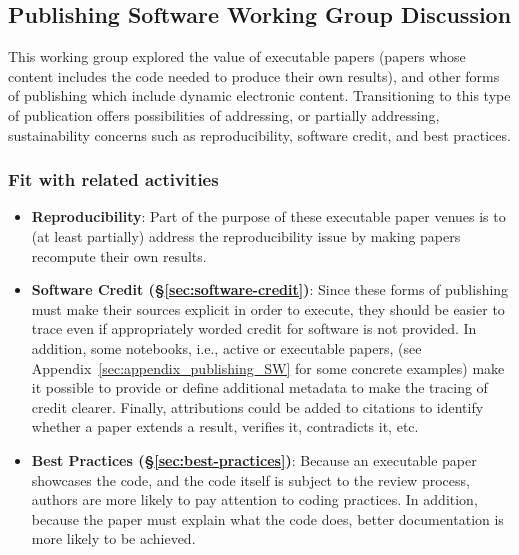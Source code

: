 \subsection{Publishing Software Working Group Discussion} \label{sec:publishing-software}

This working group explored the value of executable papers (papers whose content
includes the code needed to produce their own results), and other forms of
publishing which include dynamic electronic content.
%
%
Transitioning to this type of publication offers possibilities of addressing, or
partially addressing, sustainability concerns such as reproducibility, software
credit, and best practices.

\subsubsection{Fit with related activities}

\begin{itemize}
\item \textbf{Reproducibility}: Part of the purpose of these executable paper venues
is to (at least partially) address the reproducibility issue by making papers
recompute their own results.

\item\textbf{Software Credit (\S\ref{sec:software-credit})}: Since these forms of
publishing must make their sources explicit in order to execute, they should be
easier to trace even if appropriately worded credit for software is not
provided. In addition, some  notebooks, i.e., active or executable papers,
(see Appendix~\ref{sec:appendix_publishing_SW} for some concrete examples) 
make it possible to provide or define
additional metadata to make the tracing of credit clearer. Finally, attributions
could be added to citations to identify whether a paper extends a result,
verifies it, contradicts it, etc.

\item \textbf{Best Practices (\S\ref{sec:best-practices})}: Because an executable
paper showcases the code, and the code itself is subject to the review process,
authors are more likely to pay attention to coding practices. In addition,
because the paper must explain what the code does, better documentation is
more likely to be achieved.
\end{itemize}

